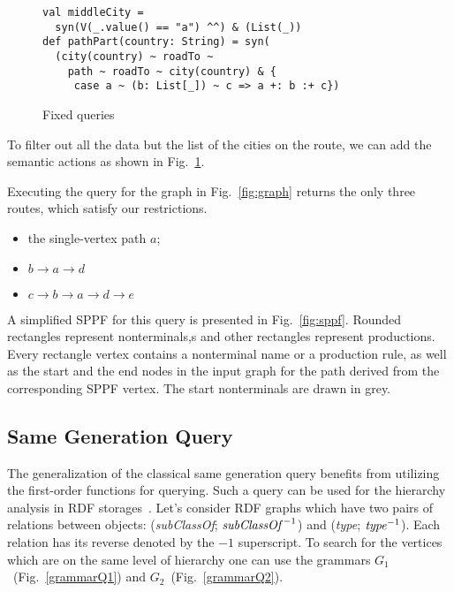\begin{figure}[h]
\begin{lstlisting}
val middleCity =
  syn(V(_.value() == "a") ^^) & (List(_))
def pathPart(country: String) = syn(
  (city(country) ~ roadTo ~
    path ~ roadTo ~ city(country) & {
     case a ~ (b: List[_]) ~ c => a +: b :+ c})
\end{lstlisting}
\caption{Fixed queries}
\label{fig:fixedPathQ}
\end{figure}

To filter out all the data but the list of the cities on the route, we can add the semantic actions as shown in Fig.~\ref{fig:fixedPathQ}.


Executing the query for the graph in Fig.~\ref{fig:graph} returns the only three routes, which satisfy our restrictions.

\begin{itemize}
\item the single-vertex path $a$;
\item $b \rightarrow a \rightarrow d$
\item $c \rightarrow b \rightarrow a \rightarrow d \rightarrow e$
\end{itemize}

A simplified SPPF for this query is presented in Fig.~\ref{fig:sppf}. Rounded rectangles represent nonterminals,s and other rectangles represent productions.
Every rectangle vertex contains a nonterminal name or a production rule, as well as the start and the end nodes in the input graph for the path derived from the corresponding SPPF vertex.
The start nonterminals are drawn in grey.

\subsection{Same Generation Query}

The generalization of the classical same generation query benefits from utilizing the first-order functions for querying.
Such a query can be used for the hierarchy analysis in RDF storages~\cite{CFGonRDF}.
Let's consider RDF graphs which have two pairs of relations between objects: (\emph{subClassOf}; $\text{\emph{subClassOf}}^{-1}$) and (\emph{type}; $\text{\emph{type}}^{-1}$). Each relation has its reverse denoted by the $-1$ superscript.
To search for the vertices which are on the same level of hierarchy one can use the grammars $G_1$~(Fig.~\ref{grammarQ1}) and $G_2$~(Fig.~\ref{grammarQ2}).

